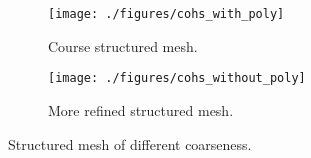 \documentclass[generate_interface_elements.tex]{subfiles}
\begin{document}
\begin{figure}
\centering
\begin{subfigure}[b]{.5\textwidth}
  \centering
  \texttt{[image: ./figures/cohs\_with\_poly]}
  \caption{Course structured mesh.}
  \label{fig:pois_voronoi_struct_a}
\end{subfigure}%
\begin{subfigure}[b]{.5\textwidth}
  \centering
  \texttt{[image: ./figures/cohs\_without\_poly]}
  \caption{More refined structured mesh.}
  \label{fig:pois_voronoi_struct_b}
\end{subfigure}
\caption{Structured mesh of different coarseness.}
\label{fig:pois_voronoi_struct}
\end{figure}
\end{document}
